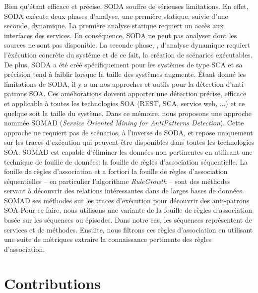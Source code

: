 \begin{introduction}
Bien qu'\'etant efficace et pr\'ecise, SODA souffre de s\'erieuses limitations.
En effet, SODA ex\'ecute deux phases d'analyse, une premi\`ere statique, suivie d'une seconde, dynamique.
La premi\`ere analyse statique requiert un acc\`es aux interfaces des services.
En cons\'equence, SODA ne peut pas analyser dont les sources ne sont pas disponible.
La seconde phase, , d'analyse dynamique requiert l'\'ex\'ecution concr\`ete du syst\`eme et de ce fait, la cr\'eation de sc\'enarios ex\'ecutables.
De plus, SODA a \'et\'e cr\'e\'e sp\'ecifiquement pour les syst\`emes de type SCA et sa pr\'ecision tend \`a faiblir lorsque la taille des syst\`emes augmente.
\'Etant donn\'e les limitations de SODA, il y a un  nos approches et outils pour la d\'etection d'anti-patrons SOA.
Ces am\'eliorations doivent apporter une d\'etection pr\'ecise, efficace et applicable \`a toutes les technologies SOA (REST, SCA, service web, ...) et ce quelque soit la taille du syst\`eme.
Dans ce m\'emoire, nous proposons une approche nomm\'ee SOMAD (\textit{Service Oriented Mining for AntiPatterns Detection}).
Cette approche ne requiert pas de sc\'enarios, \`a l'inverse de SODA, et repose uniquement sur les traces d'ex\'ecution qui peuvent \^etre disponibles dans toutes les technologies SOA.
SOMAD est capable d'\'eliminer les donn\'ees non pertinentes en utilisant une technique de fouille de donn\'ees: la fouille de r\`egles d'association s\'equentielle.
La fouille de r\`egles d'association \citep{Agrawal1994} et a fortiori la fouille de r\`egles d'association s\'equentielles -- en particulier l'algorithme \textit{RuleGrowth} \citep{Fournier-viger2011} -- sont des m\'ethodes servant \`a d\'ecouvrir des relations int\'eressantes dans de larges bases de donn\'ees.
SOMAD  ses m\'ethodes sur les traces d'ex\'ecution pour d\'ecouvrir des anti-patrons SOA  Pour ce faire, nous utilisons une variante de la fouille de r\`egles d'association bas\'ee sur les s\'equences ou \'episodes.
Dans notre cas, les s\'equences repr\'esentent  de services et de m\'ethodes.
Ensuite, nous filtrons ces r\`egles d'association en utilisant une suite de m\'etriques extraire la connaissance pertinente des r\`egles d'association.

\section*{Contributions}


\end{introduction}
